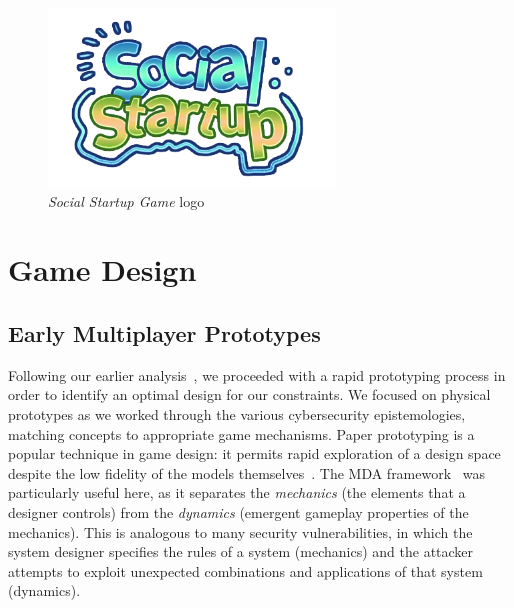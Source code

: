 \documentclass[letterpaper]{article}
\begin{document}
\begin{figure}
\begin{framed}
\centering
\includegraphics[width=3in]{images/logo.png}
\caption{\textit{Social Startup Game} logo}
\label{fig:logo}
\end{framed}
\end{figure}

\section{Game Design}
\label{sec:design}

\subsection{Early Multiplayer Prototypes}

Following our earlier analysis~\citep{Gestwicki2015}, 
we proceeded with a rapid prototyping process in order to identify
an optimal design for our constraints.
We focused on physical prototypes
as we worked through the various cybersecurity epistemologies,
matching concepts to appropriate game mechanisms.
Paper prototyping is a popular technique in game design: it permits
rapid exploration of a design space despite the low fidelity
of the models themselves~\citep{Schreiber2009,Fullerton2014}.
%
The MDA framework~\citep{Hunicke2004} was particularly useful here, 
as it separates the \textit{mechanics} (the elements that a designer
controls) from the \textit{dynamics} (emergent gameplay properties of the
mechanics). This is analogous to many security vulnerabilities, in which
the system designer specifies the rules of a system (mechanics) and the
attacker attempts to exploit unexpected combinations and applications
of that system (dynamics).
\end{document}
